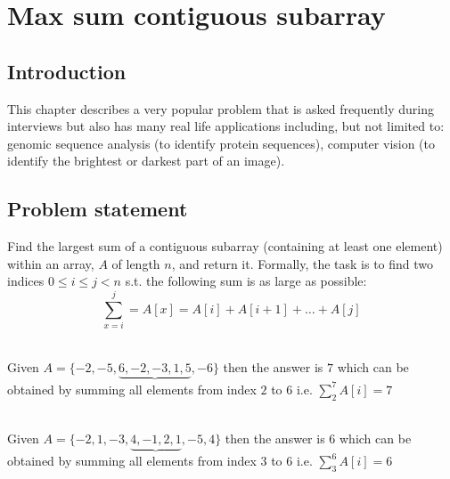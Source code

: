 
\chapter{Max sum contiguous subarray}
\label{ch:max_sum_continguous_subarray}
\section*{Introduction}
This chapter describes a very popular problem that is asked frequently during interviews but also has many real life applications including, but not limited to: genomic sequence analysis (to identify protein sequences), computer vision (to identify the brightest or darkest part of an image). 

\section{Problem statement}
\begin{exercise}
Find the largest sum of a contiguous subarray (containing at least one element) within an array, $A$ of length $n$, and return it.
Formally, the task is to find two indices $ 0 \leq i \leq j < n$ s.t. the following sum is as large as possible:
\[
\sum_{x=i}^j   = A[x] = A[i] + A[i+1] + \ldots + A[j] 
\]

\end{exercise}


\begin{example}
	\hfill \\
	Given $A=\{-2, -5, \underbrace{6, -2, -3, 1, 5}\text{}, -6\}$ then the answer is $7$ which can be obtained by summing all elements from index $2$ to $6$ i.e. $\sum_{2}^7 A[i] = 7$
\end{example}

\begin{example}
	\hfill \\
	Given $A=\{-2, 1, -3, \underbrace{4, -1, 2, 1}\text{}, -5, 4\}$ then the answer is $6$ which can be obtained by summing all elements from index $3$ to $6$ i.e. $\sum_{3}^6 A[i] = 6$
	
\end{example}

